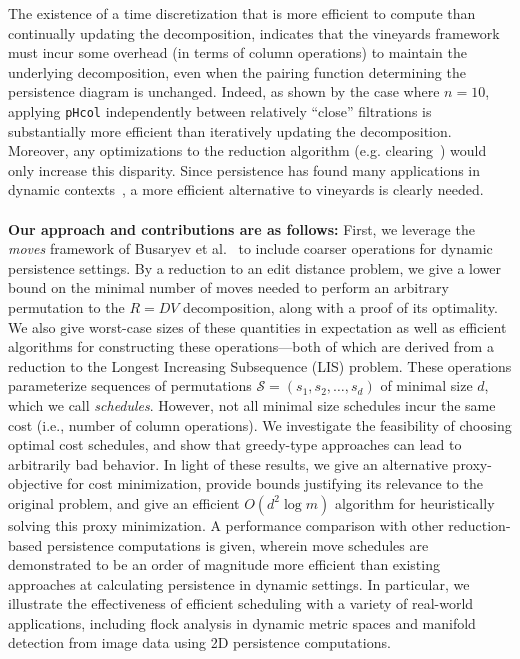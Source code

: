 \documentclass[sn-mathphys]{sn-jnl}
\begin{document}
The existence of a time discretization that is more efficient to compute than continually updating the decomposition, indicates that the vineyards framework must incur some overhead (in terms of column operations) to maintain the underlying decomposition, even when the pairing function determining the persistence diagram is unchanged. 
Indeed, as shown by the case where $n = 10$, applying \texttt{pHcol} independently between  relatively ``close'' filtrations is substantially more efficient than iteratively updating the decomposition.
 Moreover, any optimizations to the reduction algorithm (e.g. clearing~\cite{chen2011persistent}) would only increase this disparity.
Since persistence has found many applications in dynamic contexts~\cite{topaz2015topological, xian2020capturing, lesnick2015interactive, kim2020spatiotemporal}, a more efficient alternative to vineyards is clearly needed. 
 \\
 \\
 \noindent
\textbf{Our approach and contributions are as follows:} First, we leverage the \emph{moves} framework of Busaryev et al.~\cite{busaryev2010tracking} to include  coarser  operations for dynamic persistence settings. 
By a reduction to an edit distance problem, we give a   lower bound on the minimal number of moves needed to perform an arbitrary permutation to the $R = D V$ decomposition,  along with a proof of its optimality.
We also give worst-case sizes of these quantities in expectation as well as efficient algorithms for constructing these operations---both of which are derived from a reduction to the Longest Increasing Subsequence (LIS) problem. 
These operations parameterize sequences of permutations $\mathcal{S}= ( s_1, s_2, \dots, s_d )$ of minimal size $d$, which we call \emph{schedules}. 
However, not all minimal size schedules incur the same  cost 
(i.e., number of column operations).
We investigate the feasibility of choosing optimal cost schedules, and show that 
greedy-type approaches can lead to arbitrarily bad behavior. 
In light of these results, we give an alternative proxy-objective for cost minimization, provide bounds justifying its relevance to the original problem, and give an efficient $O(d^2 \log m)$ algorithm for heuristically solving this proxy minimization. 
A performance comparison with other reduction-based persistence computations is given, wherein move schedules are demonstrated to be an order of magnitude more efficient than existing approaches at calculating persistence in dynamic settings. In particular, we illustrate the effectiveness of efficient scheduling with a variety of real-world applications, including flock analysis in dynamic metric spaces and manifold detection from image data using 2D persistence computations. 
  
\end{document}
